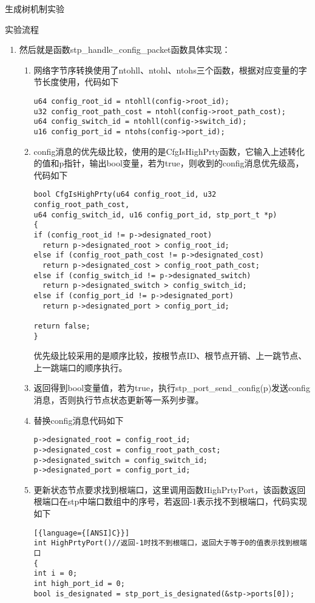 \documentclass{article} %
\begin{document}
\begin{section}{生成树机制实验}
\begin{subsection}{实验流程}
\begin{enumerate}[1)]
\begin{enumerate}[(1)]
					\end{enumerate}
				\item 然后就是函数stp\_handle\_config\_packet函数具体实现：
					\begin{enumerate}[(1)]
						\item 网络字节序转换使用了ntohll、ntohl、ntohs三个函数，根据对应变量的字节长度使用，代码如下\\
						\begin{lstlisting}[language={[ANSI]C}]
u64 config_root_id = ntohll(config->root_id);
u32 config_root_path_cost = ntohl(config->root_path_cost);
u64 config_switch_id = ntohll(config->switch_id);
u16 config_port_id = ntohs(config->port_id);
						\end{lstlisting}
						\item config消息的优先级比较，使用的是CfgIsHighPrty函数，它输入上述转化的值和p指针，输出bool变量，若为true，则收到的config消息优先级高，代码如下\\
						\begin{lstlisting}[language={[ANSI]C}]
bool CfgIsHighPrty(u64 config_root_id, u32 config_root_path_cost, 
u64 config_switch_id, u16 config_port_id, stp_port_t *p)
{
if (config_root_id != p->designated_root)
  return p->designated_root > config_root_id;
else if (config_root_path_cost != p->designated_cost)
  return p->designated_cost > config_root_path_cost;
else if (config_switch_id != p->designated_switch)
  return p->designated_switch > config_switch_id;
else if (config_port_id != p->designated_port)
  return p->designated_port > config_port_id;

return false;
}
						\end{lstlisting}
						优先级比较采用的是顺序比较，按根节点ID、根节点开销、上一跳节点、上一跳端口的顺序执行。
						\item 返回得到bool变量值，若为true，执行stp\_port\_send\_config(p)发送config消息，否则执行节点状态更新等一系列步骤。
						\item 替换config消息代码如下
						\begin{lstlisting}[language={[ANSI]C}]
p->designated_root = config_root_id;
p->designated_cost = config_root_path_cost;
p->designated_switch = config_switch_id;
p->designated_port = config_port_id;
						\end{lstlisting}
						\item 更新状态节点要求找到根端口，这里调用函数HighPrtyPort，该函数返回根端口在stp中端口数组中的序号，若返回-1表示找不到根端口，代码实现如下\\
						\begin{lstlisting}[{language={[ANSI]C}}]
int HighPrtyPort()//返回-1时找不到根端口，返回大于等于0的值表示找到根端口
{
int i = 0;
int high_port_id = 0;
bool is_designated = stp_port_is_designated(&stp->ports[0]);


\end{lstlisting}
\end{enumerate}
\end{enumerate}
\end{subsection}
\end{section}
\end{document}
